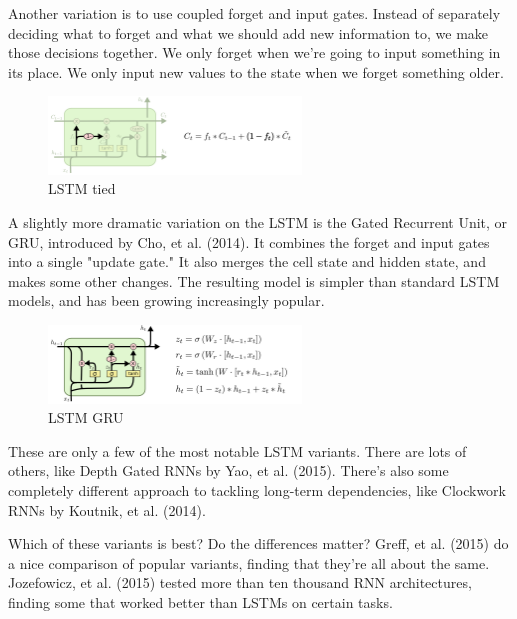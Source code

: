 {Another variation is to use coupled forget and input gates. Instead of separately deciding what to forget and what we should add new information to, we make those decisions together. We only forget when we’re going to input something in its place. We only input new values to the state when we forget something older.
\renewcommand{\figurename}{Abb.}
\begin{figure}[htp]
\centering
\includegraphics[width=0.60\textwidth]{pictures/LSTM3-var-tied.png}
\caption[LSTM tied]{LSTM tied\protect\footnotemark}
\end{figure}
A slightly more dramatic variation on the LSTM is the Gated Recurrent Unit, or GRU, introduced by Cho, et al. (2014). It combines the forget and input gates into a single "update gate." It also merges the cell state and hidden state, and makes some other changes. The resulting model is simpler than standard LSTM models, and has been growing increasingly popular.
\renewcommand{\figurename}{Abb.}
\begin{figure}[htp]
\centering
\includegraphics[width=0.60\textwidth]{pictures/LSTM3-var-GRU.png}
\caption[LSTM GRU]{LSTM GRU\protect\footnotemark}
\end{figure}
These are only a few of the most notable LSTM variants. There are lots of others, like Depth Gated RNNs by Yao, et al. (2015). There’s also some completely different approach to tackling long-term dependencies, like Clockwork RNNs by Koutnik, et al. (2014).

Which of these variants is best? Do the differences matter? Greff, et al. (2015) do a nice comparison of popular variants, finding that they’re all about the same. Jozefowicz, et al. (2015) tested more than ten thousand RNN architectures, finding some that worked better than LSTMs on certain tasks.

}
